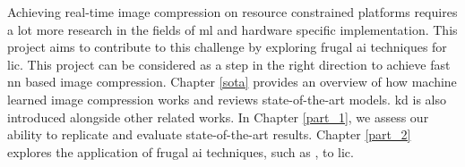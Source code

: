 Achieving real-time image compression on resource constrained platforms requires a lot more research in the fields of \acrshort{ml} and hardware specific implementation. This project aims to contribute to this challenge by exploring frugal \acrfull{ai} techniques for \acrshort{lic}. This project can be considered as a step in the right direction to achieve fast \acrshort{nn} based image compression. Chapter \ref{sota} provides an overview of how machine learned image compression works and reviews state-of-the-art models. \acrfull{kd} is also introduced alongside other related works. In Chapter \ref{part_1}, we assess our ability to replicate and evaluate state-of-the-art results. Chapter \ref{part_2} explores the application of frugal \acrshort{ai} techniques, such as , to \acrshort{lic}.